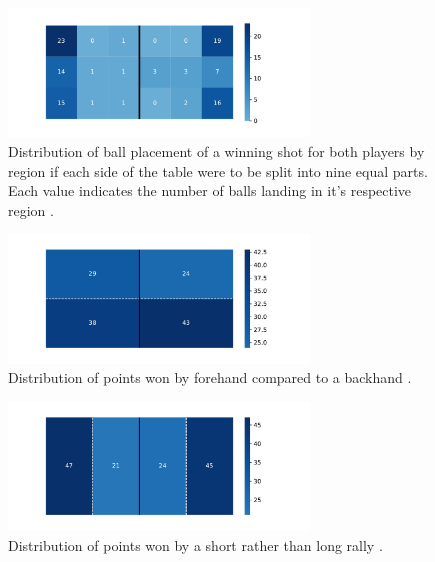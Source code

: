 \begin{figure}[t]
\centering

\includegraphics[width=8cm]{plots/tableheatmaprot.pdf}
\caption{Distribution of ball placement of a winning shot for both players by region if each side of the table were to be split into nine equal parts. Each value indicates the number of balls landing in it's respective region \cite{OSAI}.}

\label{fig:pos}
\end{figure}



\begin{figure}[ht]
\centering

\includegraphics[width=8cm]{plots/forehandvsbackhand.pdf}
\caption{Distribution of points won by forehand compared to a backhand \cite{OSAI}.}

\label{fig:fvbh}
\end{figure}

\begin{figure}[ht]
\centering

\includegraphics[width=8cm]{plots/shortvslongrally.pdf}
\caption{Distribution of points won by a short rather than long rally \cite{OSAI}.}

\label{fig:svlr}
\end{figure}


 
